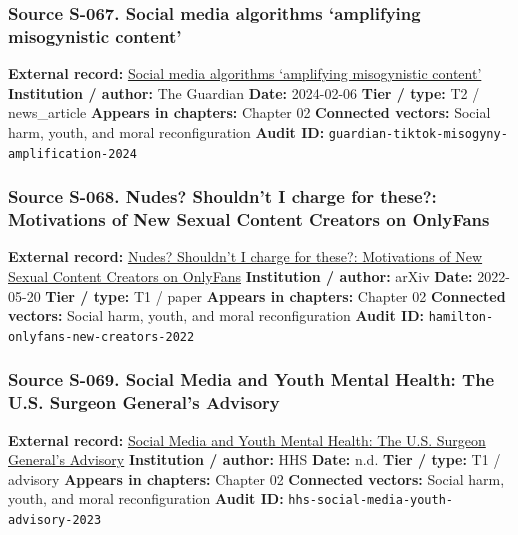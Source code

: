 \documentclass[
  american,
  11pt,
  letterpaper,
]{article}
\begin{document}
\subsubsection{Source S-067. Social media algorithms `amplifying
misogynistic
content'}\label{source-s-067-social-media-algorithms-amplifying-misogynistic-content}

\textbf{External record:}
\href{https://www.theguardian.com/media/2024/feb/06/social-media-algorithms-amplifying-misogynistic-content}{Social
media algorithms `amplifying misogynistic content'} \textbf{Institution
/ author:} The Guardian \textbf{Date:} 2024-02-06 \textbf{Tier / type:}
T2 / news\_article \textbf{Appears in chapters:} Chapter 02
\textbf{Connected vectors:} Social harm, youth, and moral
reconfiguration \textbf{Audit ID:}
\texttt{guardian-tiktok-misogyny-amplification-2024}

\subsubsection{Source S-068. Nudes? Shouldn't I charge for these?:
Motivations of New Sexual Content Creators on
OnlyFans}\label{source-s-068-nudes-shouldn-t-i-charge-for-these-motivations-of-new-sexual-content-creators-on-onlyfans}

\textbf{External record:} \href{https://arxiv.org/abs/2205.10425}{Nudes?
Shouldn't I charge for these?: Motivations of New Sexual Content
Creators on OnlyFans} \textbf{Institution / author:} arXiv
\textbf{Date:} 2022-05-20 \textbf{Tier / type:} T1 / paper
\textbf{Appears in chapters:} Chapter 02 \textbf{Connected vectors:}
Social harm, youth, and moral reconfiguration \textbf{Audit ID:}
\texttt{hamilton-onlyfans-new-creators-2022}

\subsubsection{Source S-069. Social Media and Youth Mental Health: The
U.S. Surgeon General's
Advisory}\label{source-s-069-social-media-and-youth-mental-health-the-u-s-surgeon-general-s-advisory}

\textbf{External record:}
\href{https://www.hhs.gov/surgeongeneral/priorities/youth-mental-health/social-media/index.html}{Social
Media and Youth Mental Health: The U.S. Surgeon General's Advisory}
\textbf{Institution / author:} HHS \textbf{Date:} n.d. \textbf{Tier /
type:} T1 / advisory \textbf{Appears in chapters:} Chapter 02
\textbf{Connected vectors:} Social harm, youth, and moral
reconfiguration \textbf{Audit ID:}
\texttt{hhs-social-media-youth-advisory-2023}
\end{document}

